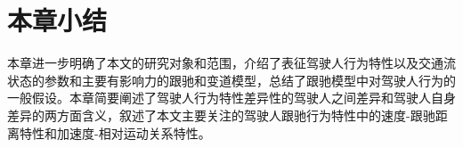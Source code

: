 % 
% 
 
%


\section{本章小结}
本章进一步明确了本文的研究对象和范围，介绍了表征驾驶人行为特性以及交通流状态的参数和主要有影响力的跟驰和变道模型，总结了跟驰模型中对驾驶人行为的一般假设。本章简要阐述了驾驶人行为特性差异性的驾驶人之间差异和驾驶人自身差异的两方面含义，叙述了本文主要关注的驾驶人跟驰行为特性中的速度-跟驰距离特性和加速度-相对运动关系特性。
